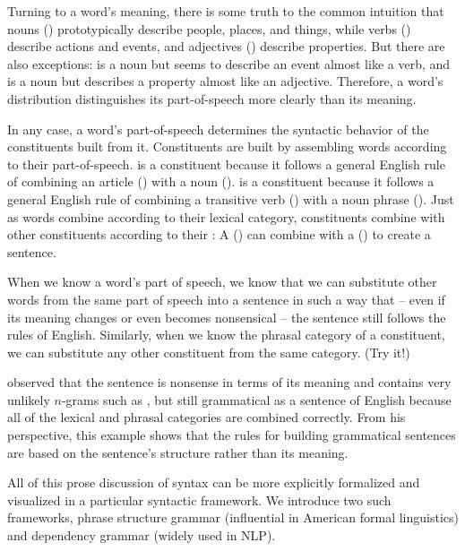Turning to a word's meaning, there is some truth to the common intuition that nouns () prototypically describe people, places, and things, while verbs () describe actions and events, and adjectives () describe properties.  But there are also exceptions:  is a noun but seems to describe an event almost like a verb, and  is a noun but describes a property almost like an adjective.  Therefore, a word's distribution distinguishes its part-of-speech more clearly than its meaning.

In any case, a word's part-of-speech determines the syntactic behavior of the constituents built from it.
Constituents are built by assembling words according to their part-of-speech.   is a constituent because it follows a general English rule of combining an article () with a noun ().   is a constituent because it follows a general English rule of combining a transitive verb () with a noun phrase ().
Just as words combine according to their lexical category, constituents  combine with other constituents according to their : A  () can combine with a  () to create a sentence.

When we know a word's part of speech, we know that we can substitute  other words from the same part of speech into a sentence in such a way that  --  even if its meaning changes or even becomes nonsensical -- the sentence still follows the rules of English.  Similarly, when we know the phrasal category of a constituent, we can substitute any other constituent from the same category. (Try it!) 


\citet{Chomsky:1957} observed that the sentence  is nonsense in terms of its meaning and contains very unlikely $n$-grams such as , but still grammatical as a sentence of English because all of the lexical and phrasal categories are combined correctly.  From his perspective, this example shows that the rules for building grammatical sentences are based on the sentence's structure rather than its meaning.


All of this prose discussion of syntax can be more explicitly formalized and visualized in a particular syntactic framework.  We introduce two such frameworks, phrase structure grammar (influential in American formal linguistics) and dependency grammar (widely used in NLP).%

